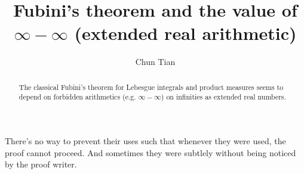 \documentclass[12pt]{amsart}
\title{Fubini's theorem and the value of $\infty-\infty$ (extended real arithmetic)}
\author{Chun Tian}
\theoremstyle{plain} %
\begin{document}
\maketitle

\begin{abstract}
  The classical Fubini's theorem for Lebesgue integrals and product
  measures seems to depend on forbidden arithmetics (e.g. $\infty -
  \infty$) on infinities as extended real numbers.
\end{abstract}

There's no way to prevent their uses such that whenever they were
used, the proof cannot proceed. And sometimes they were subtlely
without being noticed by the proof writer.
\end{document}
